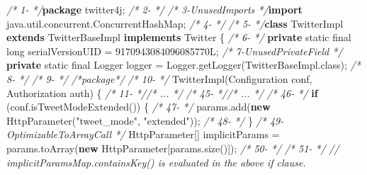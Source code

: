 \documentclass[
]{article}
\newenvironment{Shaded}{\begin{snugshade}}{\end{snugshade}}
\newcommand{\BuiltInTok}[1]{#1}
\newcommand{\CommentTok}[1]{\textcolor[rgb]{0.56,0.35,0.01}{\textit{#1}}}
\newcommand{\DataTypeTok}[1]{\textcolor[rgb]{0.13,0.29,0.53}{#1}}
\newcommand{\DecValTok}[1]{\textcolor[rgb]{0.00,0.00,0.81}{#1}}
\newcommand{\FunctionTok}[1]{\textcolor[rgb]{0.00,0.00,0.00}{#1}}
\newcommand{\ImportTok}[1]{#1}
\newcommand{\KeywordTok}[1]{\textcolor[rgb]{0.13,0.29,0.53}{\textbf{#1}}}
\newcommand{\NormalTok}[1]{#1}
\newcommand{\StringTok}[1]{\textcolor[rgb]{0.31,0.60,0.02}{#1}}
\begin{document}
\begin{landscape}

\footnotesize

\begin{Shaded}
\begin{Highlighting}[]
\CommentTok{/*  1-                                   */}\KeywordTok{package}\ImportTok{ twitter4j;}
\CommentTok{/*  2-                                   */}
\CommentTok{/*  3-UnusedImports                      */}\KeywordTok{import}\ImportTok{ java.util.concurrent.ConcurrentHashMap;}
\CommentTok{/*  4-                                   */}
\CommentTok{/*  5-                                   */}\KeywordTok{class}\NormalTok{ TwitterImpl }\KeywordTok{extends}\NormalTok{ TwitterBaseImpl }\KeywordTok{implements}\NormalTok{ Twitter \{}
\CommentTok{/*  6-                                   */}    \KeywordTok{private} \DataTypeTok{static} \DataTypeTok{final} \DataTypeTok{long}\NormalTok{ serialVersionUID = }\DecValTok{9170943084096085770L}\NormalTok{;}
\CommentTok{/*  7-UnusedPrivateField                 */}    \KeywordTok{private} \DataTypeTok{static} \DataTypeTok{final} \BuiltInTok{Logger}\NormalTok{ logger = }\BuiltInTok{Logger}\NormalTok{.}\FunctionTok{getLogger}\NormalTok{(TwitterBaseImpl.}\FunctionTok{class}\NormalTok{);}
\CommentTok{/*  8-                                   */}    
\CommentTok{/*  9-                                   */}    \CommentTok{/*package*/}
\CommentTok{/* 10-                                   */}    \FunctionTok{TwitterImpl}\NormalTok{(}\BuiltInTok{Configuration}\NormalTok{ conf, Authorization auth) \{}
\CommentTok{/* 11-                                   *//* ...  */}
\CommentTok{/* 45-                                   *//* ...  */}
\CommentTok{/* 46-                                   */}            \KeywordTok{if}\NormalTok{ (conf.}\FunctionTok{isTweetModeExtended}\NormalTok{()) \{}
\CommentTok{/* 47-                                   */}\NormalTok{                params.}\FunctionTok{add}\NormalTok{(}\KeywordTok{new} \FunctionTok{HttpParameter}\NormalTok{(}\StringTok{"tweet_mode"}\NormalTok{, }\StringTok{"extended"}\NormalTok{));}
\CommentTok{/* 48-                                   */}\NormalTok{            \}}
\CommentTok{/* 49-OptimizableToArrayCall             */}\NormalTok{            HttpParameter[] implicitParams = params.}\FunctionTok{toArray}\NormalTok{(}\KeywordTok{new}\NormalTok{ HttpParameter[params.}\FunctionTok{size}\NormalTok{()]);}
\CommentTok{/* 50-                                   */}
\CommentTok{/* 51-                                   */}            \CommentTok{// implicitParamsMap.containsKey() is evaluated in the above if clause.}

\end{Highlighting}
\end{Shaded}
\end{landscape}
\end{document}
